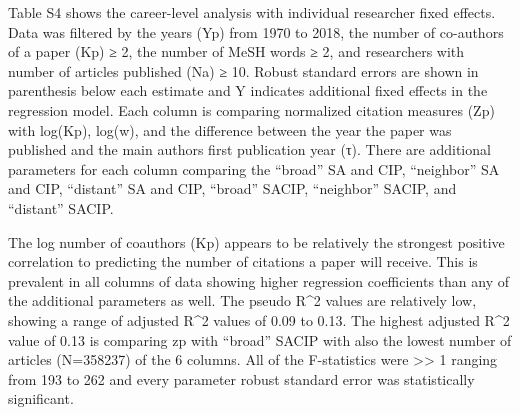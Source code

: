 \documentclass[
]{article}
\begin{document}
Table S4 shows the career-level analysis with individual researcher
fixed effects. Data was filtered by the years (Yp) from 1970 to 2018,
the number of co-authors of a paper (Kp) ≥ 2, the number of MeSH words ≥
2, and researchers with number of articles published (Na) ≥ 10. Robust
standard errors are shown in parenthesis below each estimate and Y
indicates additional fixed effects in the regression model. Each column
is comparing normalized citation measures (Zp) with log(Kp), log(w), and
the difference between the year the paper was published and the main
authors first publication year (τ). There are additional parameters for
each column comparing the ``broad'' SA and CIP, ``neighbor'' SA and CIP,
``distant'' SA and CIP, ``broad'' SACIP, ``neighbor'' SACIP, and
``distant'' SACIP.

The log number of coauthors (Kp) appears to be relatively the strongest
positive correlation to predicting the number of citations a paper will
receive. This is prevalent in all columns of data showing higher
regression coefficients than any of the additional parameters as well.
The pseudo R\^{}2 values are relatively low, showing a range of adjusted
R\^{}2 values of 0.09 to 0.13. The highest adjusted R\^{}2 value of 0.13
is comparing zp with ``broad'' SACIP with also the lowest number of
articles (N=358237) of the 6 columns. All of the F-statistics were
\textgreater\textgreater{} 1 ranging from 193 to 262 and every parameter
robust standard error was statistically significant.
\end{document}
